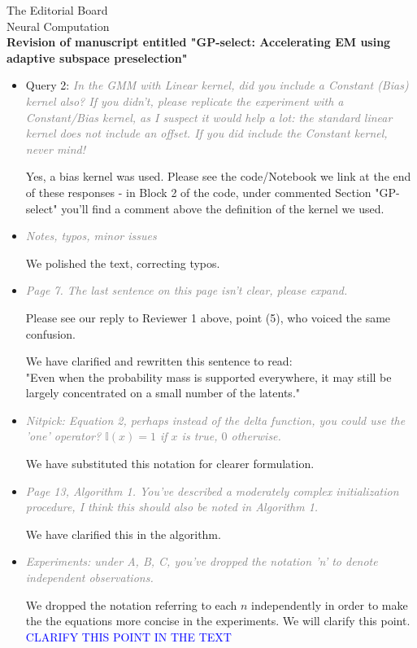 \documentclass[10pt]{letter}
\newcommand{\rvr}[1]{\textcolor{gray}{#1}}
\newcommand{\rev}[1]{\textcolor{blue}{#1}}
\begin{document}
\begin{letter}{
The Editorial Board\\
Neural Computation\\
\vspace{10mm}
\textbf{Revision of manuscript entitled "GP-select: Accelerating EM using adaptive
subspace preselection"}
}
\begin{itemize}[topsep=3pt,itemsep=2ex,partopsep=1ex,parsep=1ex]
    This is a point that Reviewer 1 also brought up in point (14), please also see our detailed response above.

    \item  Query 2: \rvr{\emph{In the GMM with Linear kernel, did you include a Constant (Bias) kernel
also? If you didn't, please replicate the experiment with a Constant/Bias
kernel, as I suspect it would help a lot: the standard linear kernel does
not include an offset. If you did include the Constant kernel, never
mind!}}

    Yes, a bias kernel was used. Please see the code/Notebook we link at the end of these responses - in Block 2 of the code, under commented  Section "GP-select" you'll find a comment above the definition of the kernel we used.

    \item \rvr{\emph{Notes, typos, minor issues}}
    
    We polished the text, correcting typos.

    \item \rvr{\emph{Page 7. The last sentence on this page isn't clear, please expand.
}}

    Please see our reply to Reviewer 1 above, point (5), who voiced the same confusion.    

    We have clarified and rewritten this sentence to read: \\
    "Even when the probability mass is supported everywhere, it may still be largely concentrated on a small number of the latents."

    \item \rvr{\emph{Nitpick: Equation 2, perhaps instead of the delta function, you could use
the 'one' operator? $\mathbb{I}(x) = 1$ if $x$ is true, $0$ otherwise.}}

    We have substituted this notation for clearer formulation.


    \item \rvr{\emph{Page 13, Algorithm 1. You've described a moderately complex initialization procedure, I think this should also be noted in Algorithm 1.}}

We have clarified this in the algorithm.

    \item \rvr{\emph{Experiments: under A, B, C, you've dropped the notation 'n' to denote independent observations.}}

    We dropped the notation referring to each $n$ independently in order to make the the equations more concise in the experiments. We will clarify this point. \rev{CLARIFY THIS POINT IN THE TEXT}


\end{itemize}
\end{letter}
\end{document}
